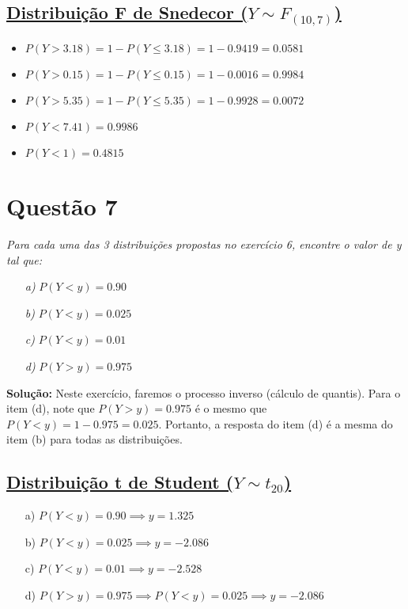 \documentclass[12pt, a4paper]{article}
\begin{document}
\subsection*{\underline{Distribuição F de Snedecor ($Y \sim F_{(10,7)}$)}}
\begin{itemize}
    \item $P(Y > 3.18) = 1 - P(Y \le 3.18) = 1 - 0.9419 = \mathbf{0.0581}$
    \item $P(Y > 0.15) = 1 - P(Y \le 0.15) = 1 - 0.0016 = \mathbf{0.9984}$
    \item $P(Y > 5.35) = 1 - P(Y \le 5.35) = 1 - 0.9928 = \mathbf{0.0072}$
    \item $P(Y < 7.41) = \mathbf{0.9986}$
    \item $P(Y < 1) = \mathbf{0.4815}$
\end{itemize}
\vspace{1cm}


\section*{Questão 7}
\textit{Para cada uma das 3 distribuições propostas no exercício 6, encontre o valor de y tal que:}
\begin{itemize}
    \item[\textit{a)}] $P(Y < y) = 0.90$
    \item[\textit{b)}] $P(Y < y) = 0.025$
    \item[\textit{c)}] $P(Y < y) = 0.01$
    \item[\textit{d)}] $P(Y > y) = 0.975$
\end{itemize}

\textbf{Solução:}
Neste exercício, faremos o processo inverso (cálculo de quantis). Para o item (d), note que $P(Y > y) = 0.975$ é o mesmo que $P(Y < y) = 1 - 0.975 = 0.025$. Portanto, a resposta do item (d) é a mesma do item (b) para todas as distribuições.
\vspace{0.5cm}

\subsection*{\underline{Distribuição t de Student ($Y \sim t_{20}$)}}
\begin{itemize}
    \item[a)] $P(Y < y) = 0.90 \implies y = \mathbf{1.325}$
    \item[b)] $P(Y < y) = 0.025 \implies y = \mathbf{-2.086}$
    \item[c)] $P(Y < y) = 0.01 \implies y = \mathbf{-2.528}$
    \item[d)] $P(Y > y) = 0.975 \implies P(Y < y) = 0.025 \implies y = \mathbf{-2.086}$
\end{itemize}
\vspace{0.5cm}
\end{document}
